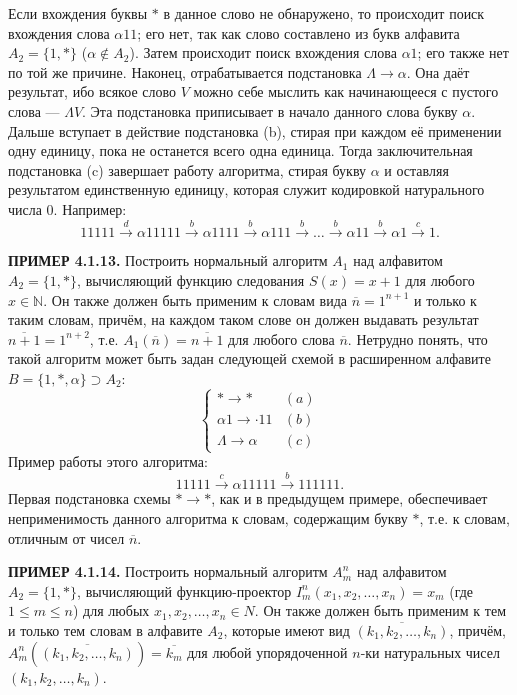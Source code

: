 \documentclass[a4paper,12pt]{article}
\begin{document}
Если вхождения буквы \(*\) в данное слово не обнаружено, то происходит поиск вхождения слова \(\alpha 11\); его нет, так как слово составлено из букв алфавита \(A_2 = \{1, *\}\) (\(\alpha \notin A_2\)). Затем происходит поиск вхождения слова \(\alpha 1\); его также нет по той же причине. Наконец, отрабатывается подстановка \(\Lambda \to \alpha\). Она даёт результат, ибо всякое слово \(V\) можно себе мыслить как начинающееся с пустого слова --- \(\Lambda V\). Эта подстановка приписывает в начало данного слова букву \(\alpha\). Дальше вступает в действие подстановка (b), стирая при каждом её применении одну единицу, пока не останется всего одна единица. Тогда заключительная подстановка (c) завершает работу алгоритма, стирая букву \(\alpha\) и оставляя результатом единственную единицу, которая служит кодировкой натурального числа 0. Например:
\[
11111 \xrightarrow{d} \alpha 11111 \xrightarrow{b} \alpha 1111 \xrightarrow{b} \alpha 111 \xrightarrow{b} \dots \xrightarrow{b} \alpha 11 \xrightarrow{b} \alpha 1 \xrightarrow{c} 1.
\]

\textbf{ПРИМЕР 4.1.13.} Построить нормальный алгоритм \(A_1\) над алфавитом \(A_2 = \{1, *\}\), вычисляющий функцию следования \(S(x) = x + 1\) для любого \(x \in \mathbb{N}\). Он также должен быть применим к словам вида \(\overline{n} = 1^{n+1}\) и только к таким словам, причём, на каждом таком слове он должен выдавать результат \(\overline{n+1} = 1^{n+2}\), т.е. \(A_1(\overline{n}) = \overline{n+1}\) для любого слова \(\overline{n}\). Нетрудно понять, что такой алгоритм может быть задан следующей схемой в расширенном алфавите \(B = \{1, *, \alpha\} \supset A_2\):
\[
\begin{cases}
* \to * & (a) \\
\alpha 1 \to \cdot 11 & (b) \\
\Lambda \to \alpha & (c)
\end{cases}
\]
Пример работы этого алгоритма:
\[
11111 \xrightarrow{c} \alpha 11111 \xrightarrow{b} 111111.
\]
Первая подстановка схемы \(* \to *\), как и в предыдущем примере, обеспечивает неприменимость данного алгоритма к словам, содержащим букву \(*\), т.е. к словам, отличным от чисел \(\overline{n}\).

\textbf{ПРИМЕР 4.1.14.} Построить нормальный алгоритм \(A_m^n\) над алфавитом \(A_2 = \{1, *\}\), вычисляющий функцию-проектор \(I_m^n(x_1, x_2, \dots, x_n) = x_m\) (где \(1 \le m \le n\)) для любых \(x_1, x_2, \dots, x_n \in N\). Он также должен быть применим к тем и только тем словам в алфавите \(A_2\), которые имеют вид \(\overline{(k_1, k_2, \dots, k_n)}\), причём, \(A_m^n(\overline{(k_1, k_2, \dots, k_n)}) = \overline{k_m}\) для любой упорядоченной \(n\)-ки натуральных чисел \((k_1, k_2, \dots, k_n)\).
\end{document}
